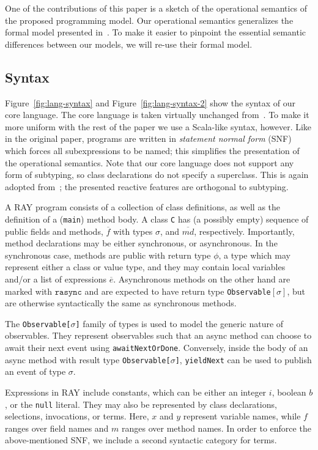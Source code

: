 \documentclass{acm_proc_article-sp}
\newcommand{\seq}[1]{\overline{#1}}
\begin{document}
One of the contributions of this paper is a sketch of the operational semantics of the
proposed programming model. Our operational semantics generalizes the formal
model presented in~\cite{FormalizingAsync}. To make it easier to pinpoint the essential
semantic differences between our models, we will re-use their formal model.

\subsection{Syntax}

Figure~\ref{fig:lang-syntax} and Figure~\ref{fig:lang-syntax-2} show the
syntax of our core language. The core language is taken virtually unchanged
from~\cite{FormalizingAsync}. To make it more uniform with the rest of the
paper we use a Scala-like syntax, however. Like in the original paper, programs
are written in {\em statement normal form} (SNF) which forces all
subexpressions to be named; this simplifies the presentation of the
operational semantics. Note that our core language does not support any form
of subtyping, so class declarations do not specify a superclass. This is again
adopted from~\cite{FormalizingAsync}; the presented reactive features are
orthogonal to subtyping.

A RAY program consists of a collection of class definitions, as well as the
definition of a (\texttt{main}) method body. A class \texttt{C} has (a
possibly empty) sequence of  public fields and methods, $\seq{f}$ with types
$\sigma$, and $\seq{md}$, respectively. Importantly, method declarations may be
either synchronous, or asynchronous. In the synchronous case, methods are
public with return type $\phi$, a type which may represent either a class or
value type, and they may contain local variables and/or a list of expressions
$\seq{e}$. Asynchronous methods on the other hand are marked with
$\texttt{rasync}$ and are expected to have return type
\texttt{Observable$[\sigma]$}, but are otherwise syntactically the same
as synchronous methods.

The \texttt{Observable[$\sigma$]} family of types is used to model the
generic nature of observables. They represent observables such that an async
method can choose to await their next event using \texttt{awaitNextOrDone}.
Conversely, inside the body of an async method with result type
\texttt{Observable[$\sigma$]}, \texttt{yieldNext} can be used to publish an
event of type $\sigma$.

Expressions in RAY include constants, which can be either an integer $i$,
boolean $b$, or the \texttt{null} literal. They may also be represented by
class declarations, selections, invocations, or terms. Here, $x$ and $y$
represent variable names, while $f$ ranges over field names and $m$ ranges
over method names. In order to enforce the above-mentioned SNF, we include a
second syntactic category for terms.
\end{document}
